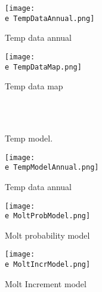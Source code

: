 \documentclass[11pt]{article}
\newcommand{\e}{\string~/bio.data/bio.lobster/figures/LFA2733Framework2018/} %
\begin{document}

    \begin{figure}
    \centering
        \texttt{[image: \\e TempDataAnnual.png]}
        \caption{Temp data annual}

    \end{figure}

    \begin{figure}
    \centering
        \texttt{[image: \\e TempDataMap.png]}
        \caption{Temp data map}

    \end{figure}

        \begin{figure}
        \centering
                \\
                \\
        
         \caption{Temp model.}
        \end{figure}



    \begin{figure}
    \centering
        \texttt{[image: \\e TempModelAnnual.png]}
        \caption{Temp data annual}

    \end{figure}




    \begin{figure}
    \centering
        \texttt{[image: \\e MoltProbModel.png]}
        \caption{Molt probability model}

    \end{figure}

    \begin{figure}
    \centering
        \texttt{[image: \\e MoltIncrModel.png]}
        \caption{Molt Increment model}

    \end{figure}    
\end{document}
